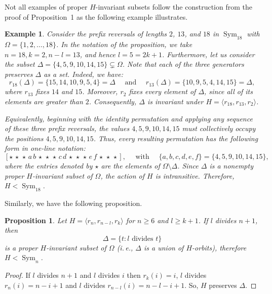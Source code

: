 \documentclass[
final
]{dmtcs-episciences}
\newtheorem{proposition}{Proposition}
\newtheorem{example}{Example}
\DeclareMathOperator{\Sym}{\mathrm{Sym}}
\begin{document}
Not all examples of proper $H$-invariant subsets follow the construction from the proof of Proposition~1 as the following example illustrates.

\begin{example}
 Consider the prefix reversals of lengths $2$, $13$, and $18$ in $\Sym_{18}$ with $\Omega=\{1,2,\ldots,18\}$. In the notation of the proposition, we take $n=18, k=2, n-l=13$, and hence $l=5=2k+1$. Furthermore, let us consider the subset $\Delta=\{4,5,9,10,14,15\}\subsetneq\Omega$. Note that each of the three generators preserves $\Delta$ as a set. Indeed, we have:
 \[
 r_{18}(\Delta)
  =\{15,14,10,9,5,4\}
  =\Delta
 \quad
 \text{ and }
 \quad
 r_{13}(\Delta)
  =\{10,9,5,4,14,15\}
  =\Delta,
 \]
 where $r_{13}$ fixes $14$ and $15$. Moreover, $r_2$ fixes every
 element of $\Delta$, since all of its elements are greater than $2$. Consequently, $\Delta$ is invariant under $H=\langle r_{18},r_{13},r_2\rangle$.

 Equivalently, beginning with the identity permutation and applying any
 sequence of these three prefix reversals, the values $4,5,9,10,14,15$ must collectively occupy the positions
 $4,5,9,10,14,15$. Thus, every resulting permutation has the following form in one-line notation:
 \[
  [\star \,\star\,\star\,a\,b\,\star\,\star\,\star\,c\,d\,\star\,\star\,\star\,e\,f\,\star\,\star\,\star], %
 \quad \text{ with }\quad 
 \{a,b,c,d,e,f\}=\{4,5,9,10,14,15\},
 \]
 where the entries denoted by $\star$ are the elements of
 $\Omega\setminus\Delta$. Since $\Delta$ is a nonempty proper
 $H$-invariant subset of $\Omega$, the action of $H$ is intransitive. Therefore, $H<\Sym_{18}$.
\end{example}




Similarly, we have the following proposition. 


\begin{proposition}\label{Divisors} Let $H=\langle r_n, r_{n-l},r_k\rangle$ for $n \geqslant 6$ and $l \geqslant k+1$. If $l$ divides $n+1$, then  $$\Delta =\{t : l \mbox{ divides } t\}$$ is a proper $H$-invariant subset of $\Omega$ {\rm(}i.\,e., $\Delta$ is a union of $H$-orbits{\rm)}, therefore $H < \Sym_n$.
\end{proposition}

\begin{proof} 
If $l$ divides $n+1$ and $l$ divides $i$ then $r_k(i)=i$, $l$ divides $r_n(i)=n-i+1$ and $l$ divides $r_{n-l}(i)=n-l-i+1$. So, $H$ preserves $\Delta$.
\end{proof}
\end{document}

